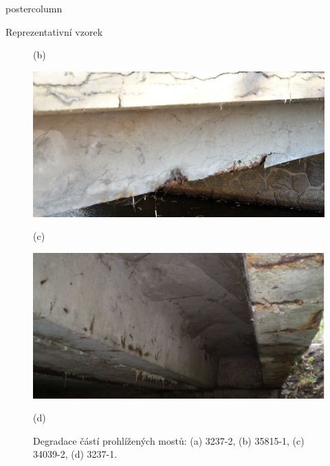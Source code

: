 \documentclass{beamer}
\begin{document}
\begin{frame}
\begin{columns}
\begin{column}{.60\textwidth}
\begin{beamercolorbox}[center]{postercolumn}
\begin{minipage}{.98\textwidth}
{\begin{myblock}{Reprezentativní vzorek}
\begin{figure}
\begin{minipage}{0.4\textwidth}
								\caption*{(b)}
							\end{minipage}
							\vskip 0.5cm
							\begin{minipage}{0.4\textwidth}
								\centering\includegraphics[width=1\textwidth]{img/1c}
								\caption*{(c)}
							\end{minipage}
							\hspace{1em}
							\begin{minipage}{0.4\textwidth}
								\centering\includegraphics[width=1\textwidth]{img/1d}
								\caption*{(d)}
							\end{minipage}
							\caption{Degradace částí prohlížených mostů: (a) 3237-2, (b) 35815-1, (c) 34039-2, (d) 3237-1.}
						\end{figure}
						\vskip 0.5cm
						\begin{minipage}{1\textwidth}
							\begin{columns}
								\begin{column}{0.72\textwidth}
									\begin{figure}
										\begin{minipage}{0.9\textwidth}

\end{minipage}
\end{figure}
\end{column}
\end{columns}
\end{minipage}
\end{myblock}}
\end{minipage}
\end{beamercolorbox}
\end{column}
\end{columns}
\end{frame}
\end{document}
